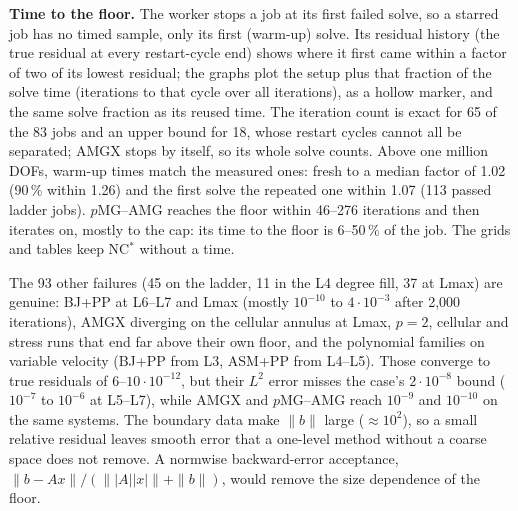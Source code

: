 \textbf{Time to the floor.} The worker stops a job at its first failed solve, so a starred job
has no timed sample, only its first (warm-up) solve. Its residual history (the true residual at
every restart-cycle end) shows where it first came within a factor of two of its lowest residual;
the graphs plot the setup plus that fraction of the solve time (iterations to that cycle over all
iterations), as a hollow marker, and the same solve fraction as its reused time. The iteration
count is exact for 65 of the 83 jobs and an upper bound for 18, whose restart cycles cannot all be
separated; AMGX stops by itself, so its whole solve counts. Above one million DOFs, warm-up times
match the measured ones: fresh to a median factor of 1.02 (90\,\% within 1.26) and the first solve
the repeated one within 1.07 (113 passed ladder jobs). $p$MG--AMG reaches the floor within
46--276 iterations and then iterates on, mostly to the cap: its time to the floor is 6--50\,\% of
the job.
The grids and tables keep NC$^*$ without a time.

The 93 other failures (45 on the ladder, 11 in the L4 degree fill, 37 at Lmax) are genuine: BJ+PP at L6--L7 and Lmax
(mostly $10^{-10}$ to $4\cdot10^{-3}$ after 2{,}000 iterations), AMGX diverging on the cellular
annulus at Lmax, $p=2$, cellular and stress runs that end far above their own floor, and the polynomial families on
variable velocity (BJ+PP from L3, ASM+PP from L4--L5). Those converge to true residuals of
$6$--$10\cdot10^{-12}$, but their $L^2$ error misses the case's $2\cdot10^{-8}$ bound ($10^{-7}$ to
$10^{-6}$ at L5--L7), while AMGX and $p$MG--AMG reach $10^{-9}$ and $10^{-10}$ on the same systems. The boundary data make $\|b\|$ large
($\approx10^2$), so a small relative residual leaves smooth error that a one-level method without a
coarse space does not remove. A normwise backward-error acceptance,
$\|b-Ax\|/(\||A||x|\|+\|b\|)$, would remove the size dependence of the floor.

\begin{table}[ht]
\centering\small

\caption{H200 job outcomes per level and family. ``FP64 floor$^*$'': not passed, but stopped at
the FP64 residual floor with the best solution's accuracy (paragraph above).}
\label{tab:adr-h200-outcomes}
\end{table}

\begin{table}[ht]
\centering\scriptsize

\caption{H200, levels beyond the Blackwell study: medians over the passed jobs of all classes
(ms). Different families pass on different classes, so the medians are not a like-for-like
ranking; Table~\ref{tab:adr-h200-outcomes} gives the coverage.}
\label{tab:adr-h200-extension}
\end{table}

